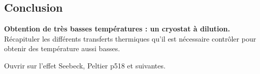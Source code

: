 \subsection*{Conclusion}

\begin{slide}
\textbf{Obtention de très basses températures  : un cryostat à dilution.}
Récapituler les différents transferts thermiques qu'il est nécessaire contrôler pour obtenir des température aussi basses. 
\end{slide}

Ouvrir sur l'effet Seebeck, Peltier \cite{Diu2008} p518 et suivantes.

\newpage